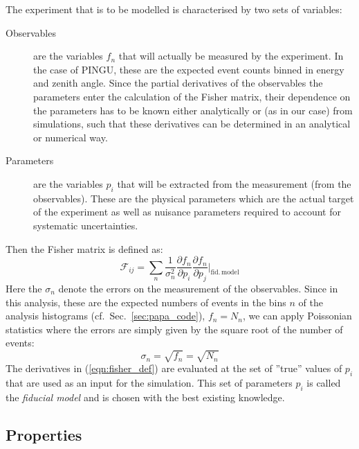 The experiment that is to be modelled is characterised by two sets of variables:
\begin{description}
 \item[Observables] are the variables $f_n$ that will actually be measured by
  the experiment. In the case of PINGU, these are the expected event counts 
  binned in energy and zenith angle. Since the partial derivatives of the
  observables \wrt the parameters enter the calculation of the Fisher matrix,
  their dependence on the parameters has to be known either analytically or (as
  in our case) from simulations, such that these derivatives can be determined
  in an analytical or numerical way.
 \item[Parameters] are the variables $p_i$ that will be extracted from the
  measurement (\ie from the observables). These are the physical parameters
  which are the actual target of the experiment as well as nuisance parameters
  required to account for systematic uncertainties.
\end{description}
Then the Fisher matrix is defined as:
\begin{equation}
 \mathcal{F}_{ij} = \sum_n \frac{1}{\sigma_n^2} \frac{\partial f_n}{\partial
p_i} \frac{\partial f_n}
 {\partial p_j}\bigg|_\mathrm{fid.\,model}
 \label{eqn:fisher_def}
\end{equation}
Here the $\sigma_n$ denote the errors on the measurement of the observables.
Since in this analysis, these are the expected numbers of events in the bins $n$
of the analysis histograms (cf.\ Sec.~\ref{sec:papa_code}), $f_n = N_n$, we
can apply Poissonian statistics where the errors are simply given by the square
root of the number of events:
\begin{equation}
 \sigma_n = \sqrt{f_n} = \sqrt{N_n}
\end{equation}
The derivatives in (\ref{eqn:fisher_def}) are evaluated at the set of ''true''
values of $p_i$ that are used as an input for the simulation. This set of
parameters $p_i$ is called the \emph{fiducial model} and is chosen with the best
existing knowledge.

\subsection{Properties}

